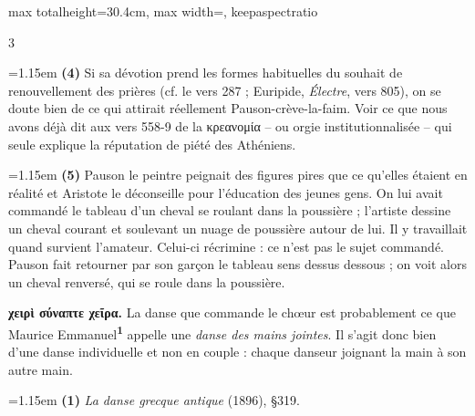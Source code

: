 \documentclass[11pt,twoside]{book}
\newcommand{\currHeadLE}{}
\newcommand{\currHeadRE}{}
\newcommand{\italique}[1]{\textit{#1}}
\newcommand{\R}{\textbf{R}}
\newcommand{\marqueur}[1]{\textsuperscript{\color{rubricRed}\textbf{#1}}}
\begin{document}
\begin{adjustbox}{max totalheight=30.4cm, max width=\textwidth, keepaspectratio}
\begin{minipage}{\textwidth}
{\begin{multicols}{3}
\par\vspace{1.5pt}
\noindent\hangindent=1.15em {\color{sepiaNote}\textbf{(4)}} Si sa dévotion prend les formes habituelles du souhait de renouvellement des prières (cf. le vers 287 ; Euripide, \italique{Électre}, vers 805), on se doute bien de ce qui attirait réellement Pauson-crève-la-faim. Voir ce que nous avons déjà dit aux vers 558-9 de la κρεανομία -- ou orgie institutionnalisée -- qui seule explique la réputation de piété des Athéniens.
\par\vspace{1.5pt}
\noindent\hangindent=1.15em {\color{sepiaNote}\textbf{(5)}} Pauson le peintre peignait des figures pires que ce qu'elles étaient en réalité et Aristote le déconseille pour l'éducation des jeunes gens. On lui avait commandé le tableau d'un cheval se roulant dans la poussière ; l'artiste dessine un cheval courant et soulevant un nuage de poussière autour de lui. Il y travaillait quand survient l'amateur. Celui-ci récrimine : ce n'est pas le sujet commandé. Pauson fait retourner par son garçon le tableau sens dessus dessous ; on voit alors un cheval renversé, qui se roule dans la poussière.
\par\vspace{1.5pt}
 \textbf{χειρὶ σύναπτε χεῖρα.} La danse que commande le chœur est probablement ce que Maurice Emmanuel\marqueur{1} appelle une \italique{danse des mains jointes}. Il s'agit donc bien d'une danse individuelle et non en couple : chaque danseur joignant la main à son autre main.
\par\vspace{1.5pt}
\par\vspace{1.2pt}\par\nopagebreak\vspace{1pt}\noindent\hangindent=1.15em {\color{sepiaNote}\textbf{(1)}} \italique{La danse grecque antique} (1896), §319.
\par\end{multicols}}
\end{minipage}\end{adjustbox}
\clearpage\ifodd\value{page}\hbox{}\newpage\fi
\renewcommand{\currHeadLE}{ΑΡΙΣΤΟΦΑΝΟΥΣ ΘΕΣΜΟΦΟΡΙΑΖΟΥΣΑΙ · CODEX RAVENNAS 429 (\R)}
\renewcommand{\currHeadRE}{Folio f. 174r (Classense 176r) · vv. 959–1000}
\end{document}
